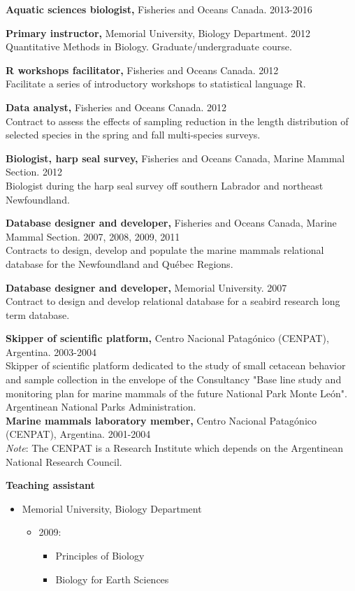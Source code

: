 \documentclass{res}
\begin{document}
\begin{resume}
\pagebreak

\textbf{Aquatic sciences biologist,} Fisheries and Oceans Canada. 2013-2016

\textbf{Primary instructor,} Memorial University, Biology Department. 2012 \\ Quantitative Methods in Biology. Graduate/undergraduate course. 

\textbf{R workshops facilitator,} Fisheries and Oceans Canada. 2012\\
Facilitate a series of introductory workshops to statistical language R.

\textbf{Data analyst,} Fisheries and Oceans Canada. 2012\\
Contract to assess the effects of sampling reduction in the length distribution of selected species in the spring and fall multi-species surveys. 

\textbf{Biologist, harp seal survey,} Fisheries and Oceans Canada, Marine Mammal Section. 2012\\
Biologist during the harp seal survey off southern Labrador and northeast Newfoundland.

\textbf{Database designer and developer,} Fisheries and Oceans Canada, Marine Mammal Section. 2007, 2008, 2009, 2011\\
Contracts to design, develop and populate the marine mammals relational database for the Newfoundland and Qu\'{e}bec Regions. 

\textbf{Database designer and developer,} Memorial University. 2007\\
Contract to design and develop relational database for a seabird research long term database. 

\textbf{Skipper of scientific platform,} Centro Nacional Patag\'{o}nico (CENPAT), Argentina. 2003-2004\\
Skipper of scientific platform dedicated to the study of small cetacean behavior and sample collection in the envelope of the Consultancy "Base line study and monitoring plan for marine mammals of the future National Park Monte Le\'{o}n". Argentinean National Parks Administration.\\

\textbf{Marine mammals laboratory member,} Centro Nacional Patag\'{o}nico (CENPAT), Argentina. 2001-2004\\

\textit{Note}: The CENPAT is a Research Institute which depends on the Argentinean National Research Council.

\textbf{Teaching assistant}
\begin{itemize}
	\item[] Memorial University, Biology Department
	\begin{itemize}
		\item[] 2009:
		\begin{itemize}
			\item[] Principles of Biology
			\item[] Biology for Earth Sciences
		\end{itemize}
	\end{itemize} 


\end{itemize}
\end{resume}
\end{document}
